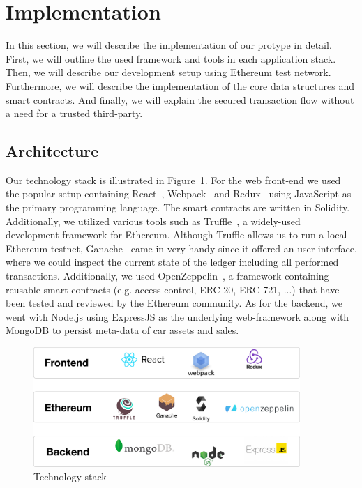 \section{Implementation} \label{sec:impl}
In this section, we will describe the implementation of our protype in detail. First, we will outline the used framework and tools in each application stack. Then, we will describe our development setup using Ethereum test network. Furthermore, we will describe the implementation of the core data structures and smart contracts. And finally, we will explain the secured transaction flow without a need for a trusted third-party.

\subsection{Architecture}
Our technology stack is illustrated in Figure~\ref{fig:techstack}. For the web front-end we used the popular setup containing React~\cite{React}, Webpack~\cite{Webpack} and Redux~\cite{Redux} using JavaScript as the primary programming language. The smart contracts are written in Solidity. Additionally, we utilized various tools such as Truffle~\cite{Truffle}, a widely-used development framework for Ethereum. Although Truffle allows us to run a local Ethereum testnet, Ganache~\cite{Ganache} came in very handy since it offered an user interface, where we could inspect the current state of the ledger including all performed transactions. Additionally, we used OpenZeppelin~\cite{OpenZeppelin}, a framework containing reusable smart contracts (e.g. access control, ERC-20, ERC-721, ...) that have been tested and reviewed by the Ethereum community. As for the backend, we went with Node.js using ExpressJS as the underlying web-framework along with MongoDB to persist meta-data of car assets and sales.

\begin{figure}[htbp]
\centerline{\includegraphics[width=0.9\textwidth]{figures/tech_stack.pdf}}
\caption{Technology stack \label{fig:techstack}}
\end{figure}

